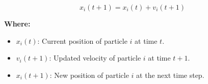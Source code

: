 
\begin{equation}
x_i(t+1) = x_i(t) + v_i(t+1)
\end{equation}

\textbf{Where:}
\begin{itemize}
    \item \( x_i(t) \): Current position of particle \( i \) at time \( t \).
    \item \( v_i(t+1) \): Updated velocity of particle \( i \) at time \( t+1 \).
    \item \( x_i(t+1) \): New position of particle \( i \) at the next time step.
\end{itemize}


